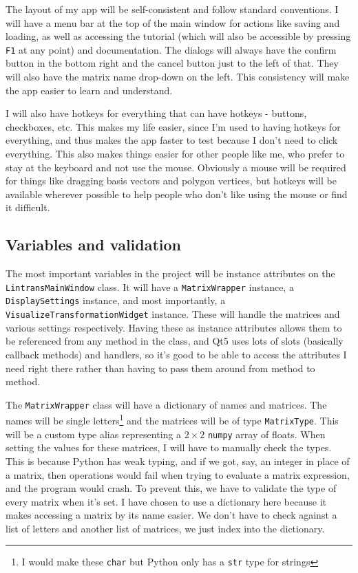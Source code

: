\documentclass[../main.tex]{subfiles}
\begin{document}
The layout of my app will be self-consistent and follow standard conventions. I will have a menu bar at the top of the main window for actions like saving and loading, as well as accessing the tutorial (which will also be accessible by pressing \texttt{F1} at any point) and documentation. The dialogs will always have the confirm button in the bottom right and the cancel button just to the left of that. They will also have the matrix name drop-down on the left. This consistency will make the app easier to learn and understand.

I will also have hotkeys for everything that can have hotkeys - buttons, checkboxes, etc. This makes my life easier, since I'm used to having hotkeys for everything, and thus makes the app faster to test because I don't need to click everything. This also makes things easier for other people like me, who prefer to stay at the keyboard and not use the mouse. Obviously a mouse will be required for things like dragging basis vectors and polygon vertices, but hotkeys will be available wherever possible to help people who don't like using the mouse or find it difficult.

\subsection{Variables and validation\label{design:variables-and-validation}}

The most important variables in the project will be instance attributes on the \texttt{LintransMainWindow} class. It will have a \texttt{MatrixWrapper} instance, a \texttt{DisplaySettings} instance, and most importantly, a \texttt{VisualizeTransformationWidget} instance. These will handle the matrices and various settings respectively. Having these as instance attributes allows them to be referenced from any method in the class, and Qt5 uses lots of slots (basically callback methods) and handlers, so it's good to be able to access the attributes I need right there rather than having to pass them around from method to method.

The \texttt{MatrixWrapper} class will have a dictionary of names and matrices. The names will be single letters\footnote{I would make these \texttt{char} but Python only has a \texttt{str} type for strings} and the matrices will be of type \texttt{MatrixType}. This will be a custom type alias representing a $2 \times 2$ \texttt{numpy} array of floats. When setting the values for these matrices, I will have to manually check the types. This is because Python has weak typing, and if we got, say, an integer in place of a matrix, then operations would fail when trying to evaluate a matrix expression, and the program would crash. To prevent this, we have to validate the type of every matrix when it's set. I have chosen to use a dictionary here because it makes accessing a matrix by its name easier. We don't have to check against a list of letters and another list of matrices, we just index into the dictionary.
\end{document}
